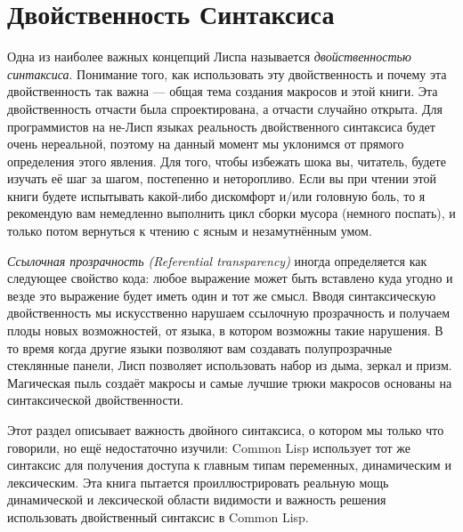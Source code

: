 \section{Двойственность Синтаксиса}\label{section_duality_of_syntax}

Одна из наиболее важных концепций Лиспа называется \emph{двойственностью синтаксиса}. Понимание того, как использовать эту двойственность и почему эта двойственность так важна --- общая тема создания макросов и этой книги. Эта двойственность отчасти была спроектирована, а отчасти случайно открыта. Для программистов на не-Лисп языках реальность двойственного синтаксиса будет очень нереальной, поэтому на данный момент мы уклонимся от прямого определения этого явления. Для того, чтобы избежать шока вы, читатель, будете изучать её шаг за шагом, постепенно и неторопливо. Если вы при чтении этой книги будете испытывать какой-либо дискомфорт и/или головную боль, то я рекомендую вам немедленно выполнить цикл сборки мусора (немного поспать), и только потом вернуться к чтению с ясным и незамутнённым умом.

\emph{Ссылочная прозрачность (Referential transparency)} иногда определяется как следующее свойство кода: любое выражение может быть вставлено куда угодно и везде это выражение будет иметь один и тот же смысл. Вводя синтаксическую двойственность мы искусственно нарушаем ссылочную прозрачность и получаем плоды новых возможностей, от языка, в котором возможны такие нарушения. В то время когда другие языки позволяют вам создавать полупрозрачные стеклянные панели, Лисп позволяет использовать набор из дыма, зеркал и призм. Магическая пыль создаёт макросы и самые лучшие трюки макросов основаны на синтаксической двойственности.

Этот раздел описывает важность двойного синтаксиса, о котором мы только что говорили, но ещё недостаточно изучили: Common Lisp использует тот же синтаксис для получения доступа к главным типам переменных, динамическим и лексическим. Эта книга пытается проиллюстрировать реальную мощь динамической и лексической области видимости и важность решения использовать двойственный синтаксис в Common Lisp.

